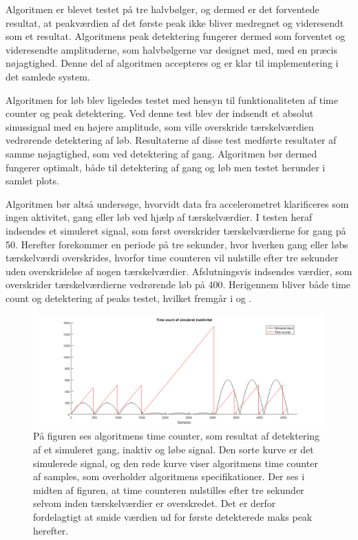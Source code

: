 Algoritmen er blevet testet på tre halvbølger, og dermed er det forventede resultat, at peakværdien af det første peak ikke bliver medregnet og videresendt som et resultat. Algoritmens peak detektering fungerer dermed som forventet og videresendte amplituderne, som halvbølgerne var designet med, med en præcis nøjagtighed. Denne del af algoritmen accepteres og er klar til implementering i det samlede system.

Algoritmen for løb blev ligeledes testet med hensyn til funktionaliteten af time counter og peak detektering. Ved denne test blev der indsendt et absolut sinussignal med en højere amplitude, som ville overskride tærskelværdien vedrørende detektering af løb. Resultaterne af disse test medførte resultater af samme nøjagtighed, som ved detektering af gang. Algoritmen bør dermed fungerer optimalt, både til detektering af gang og løb men testet herunder i samlet plots.

Algoritmen bør altså undersøge, hvorvidt data fra accelerometret klarificeres som ingen aktivitet, gang eller løb ved hjælp af tærskelværdier. I testen heraf indsendes et simuleret signal, som først overskrider tærskelværdierne for gang på 50. Herefter forekommer en periode på tre sekunder, hvor hverken gang eller løbs tærskelværdi overskrides, hvorfor time counteren vil nulstille efter tre sekunder uden overskridelse af nogen tærskelværdier. Afslutningsvis indsendes værdier, som overskrider tærskelværdierne vedrørende løb på 400. Herigennem bliver både time count og detektering af peaks testet, hvilket fremgår i  og . 
\begin{figure}[H]
	\centering
	\includegraphics[scale=0.3]{figures/cDesign/test_timecount_inaktiv.png}
	\caption{På figuren ses algoritmens time counter, som resultat af detektering af et simuleret gang, inaktiv og løbe signal. Den sorte kurve er det simulerede signal, og den røde kurve viser algoritmens time counter af samples, som overholder algoritmens specifikationer. Der ses i midten af figuren, at time counteren nulstilles efter tre sekunder selvom inden tærskelværdier er overskredet. Det er derfor fordelagtigt at smide værdien ud for første detekterede maks peak herefter.}
	\label{fig:test_inaktiv_time}
\end{figure}

